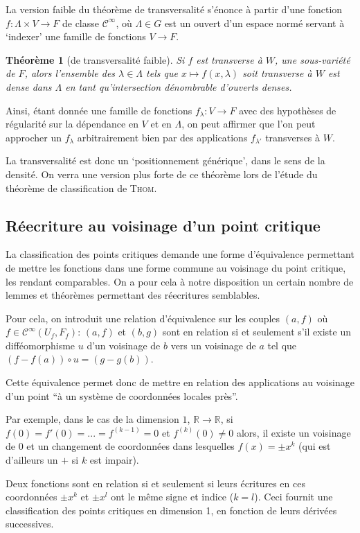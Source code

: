 \documentclass[a4paper]{article}
\newcommand{\cinf}{\mathcal{C}^\infty}
\newcommand{\R}{\mathbb{R}}
\newtheorem{thm}{Théorème}
\theoremstyle{definition}
\begin{document}
La version faible du théorème de transversalité s'énonce à partir d'une fonction $f: \Lambda\times V\to F$ de classe $\cinf$, où $\Lambda\in G$ est un ouvert d'un espace normé servant à `indexer' une famille de fonctions $V\to F$.
\begin{thm}[de transversalité faible]
	Si $f$ est transverse à $W$, une sous-variété de $F$, alors l'ensemble des $\lambda\in\Lambda$ tels que $x\mapsto f(x,\lambda)$ soit transverse à $W$ est dense dans $\Lambda$ en tant qu'intersection dénombrable d'ouverts denses.
\end{thm}

Ainsi, étant donnée une famille de fonctions $f_\lambda: V\to F$ avec des hypothèses de régularité sur la dépendance en $V$ et en $\Lambda$, on peut affirmer que l'on peut approcher un $f_\lambda$ arbitrairement bien par des applications $f_{\lambda'}$ transverses à $W$.

La transversalité est donc un `positionnement générique', dans le sens de la densité.
On verra une version plus forte de ce théorème lors de l'étude du théorème de classification de \textsc{Thom}.

\subsection{Réecriture au voisinage d'un point critique}

La classification des points critiques demande une forme d'équivalence permettant de mettre les fonctions dans une forme commune au voisinage du point critique, les rendant comparables.
On a pour cela à notre disposition un certain nombre de lemmes et théorèmes permettant des réecritures semblables.

Pour cela, on introduit une relation d'équivalence sur les couples $(a,f)$ où $f\in\cinf(U_f,F_f)$: $(a,f)$ et $(b,g)$ sont en relation si et seulement s'il existe un difféomorphisme $u$ d'un voisinage de $b$ vers un voisinage de $a$ tel que $(f-f(a))\circ u = (g-g(b))$.

Cette équivalence permet donc de mettre en relation des applications au voisinage d'un point ``à un système de coordonnées locales près''.

Par exemple, dans le cas de la dimension $1$, $\R\to\R$, si $f(0)=f'(0)=...=f^{(k-1)}=0$ et $f^{(k)}(0)\neq 0$ alors, il existe un voisinage de 0 et un changement de coordonnées dans lesquelles $f(x)=\pm x^k$ (qui est d'ailleurs un $+$ si $k$ est impair).

Deux fonctions sont en relation si et seulement si leurs écritures en ces coordonnées $\pm x^k$ et $\pm x^l$ ont le même signe et indice ($k=l$). Ceci fournit une classification des points critiques en dimension 1, en fonction de leurs dérivées successives.
\end{document}
